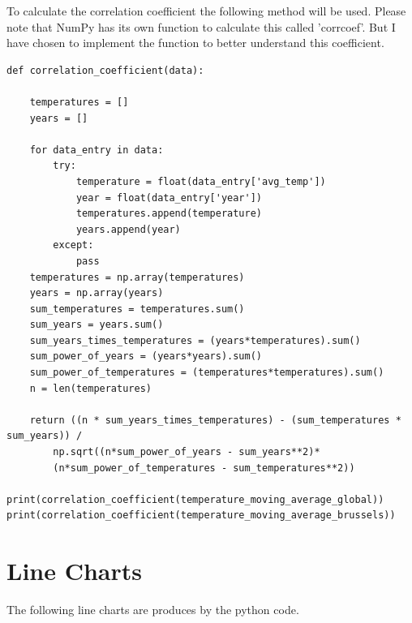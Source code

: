 \documentclass{article}
\begin{document}
To calculate the correlation coefficient the following method will be used. Please note that NumPy has its own function to calculate this called 'corrcoef'. But I have chosen to implement the function to better understand this coefficient. 

\begin{lstlisting}
def correlation_coefficient(data):

	temperatures = []
	years = []

	for data_entry in data:
		try:
			temperature = float(data_entry['avg_temp'])
			year = float(data_entry['year'])
			temperatures.append(temperature)
			years.append(year)
		except:
			pass
	temperatures = np.array(temperatures)
	years = np.array(years)
	sum_temperatures = temperatures.sum()
	sum_years = years.sum()
	sum_years_times_temperatures = (years*temperatures).sum()
	sum_power_of_years = (years*years).sum()
	sum_power_of_temperatures = (temperatures*temperatures).sum()
	n = len(temperatures)

	return ((n * sum_years_times_temperatures) - (sum_temperatures * sum_years)) / 
		np.sqrt((n*sum_power_of_years - sum_years**2)*
		(n*sum_power_of_temperatures - sum_temperatures**2))

print(correlation_coefficient(temperature_moving_average_global))
print(correlation_coefficient(temperature_moving_average_brussels))

\end{lstlisting}

\section{Line Charts}
The following line charts are produces by the python code.
\end{document}
